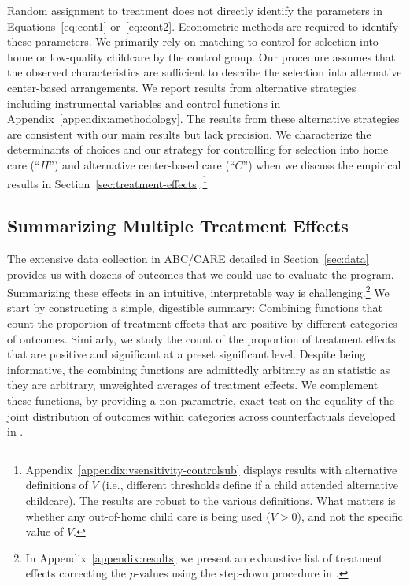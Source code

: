 Random assignment to treatment does not directly identify the parameters in Equations~\eqref{eq:cont1} or~\eqref{eq:cont2}. Econometric methods are required to identify these parameters. We primarily rely on matching to control for selection into home or low-quality childcare by the control group. Our procedure assumes that the observed characteristics are sufficient to describe the selection into alternative center-based arrangements. We report results from alternative strategies including instrumental variables and control functions in Appendix~\ref{appendix:amethodology}. The results from these alternative strategies are consistent with our main results but lack precision. We characterize the determinants of choices and our strategy for controlling for selection into home care (``$H$'') and alternative center-based care (``$C$'') when we discuss the empirical results in Section~\ref{sec:treatment-effects}.\footnote{Appendix~\ref{appendix:vsensitivity-controlsub} displays results with alternative definitions of $V$ (i.e., different thresholds define if a child attended alternative childcare). The results are robust to the various definitions. What matters is whether any out-of-home child care is being used ($V>0$), and not the specific value of $V$.}

\subsection{Summarizing Multiple Treatment Effects}\label{sec:combining-functions}

The extensive data collection in ABC/CARE detailed in Section~\ref{sec:data} provides us with dozens of outcomes that we could use to evaluate the program. Summarizing these effects in an intuitive, interpretable way is challenging.\footnote{In Appendix~\ref{appendix:results} we present an exhaustive list of treatment effects correcting the $p$-values using the step-down procedure in \citet{Romano_Wolf_2016_pval_SaPL}.} We start by constructing a simple, digestible summary: Combining functions that count the proportion of treatment effects that are positive by different categories of outcomes. Similarly, we study the count of the proportion of treatment effects that are positive and significant at a preset significant level. Despite being informative, the combining functions are admittedly arbitrary as an statistic as they are arbitrary, unweighted averages of treatment effects. We complement these functions, by providing a non-parametric, exact test on the equality of the joint distribution of outcomes within categories across counterfactuals developed in \citep{Rosenbaum_2005_Distribution_JRSS}.

